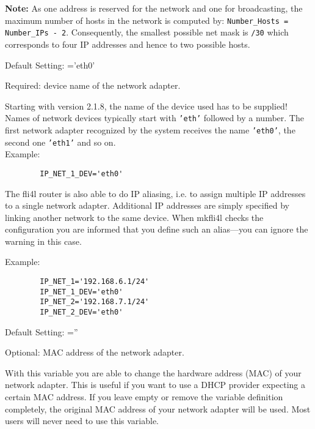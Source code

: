 \begin{description}
{   \textbf{Note: } As one address is reserved for the network and one for
   broadcasting, the maximum number of hosts in the network is computed by:
   \texttt{Number\_Hosts = Number\_IPs - 2}. Consequently, the smallest possible
   net mask is \texttt{/30} which corresponds to four IP addresses and hence to
   two possible hosts.
   }


  Default Setting: ='eth0'
  
  {Required: device name of the network adapter.

    Starting with version 2.1.8, the name of the device used has to be
    supplied! Names of network devices typically start with \texttt{'eth'} 
    followed by a number. The first network adapter recognized by the
    system receives the name \texttt{'eth0'}, the second one \texttt{'eth1'} and so on.\\

    Example:

  \begin{example}
  \begin{verbatim}
        IP_NET_1_DEV='eth0'
  \end{verbatim}
  \end{example}

    The fli4l router is also able to do IP aliasing, i.e. to assign multiple
    IP addresses to a single network adapter. Additional IP addresses are
    simply specified by linking another network to the same device. When
    mkfli4l checks the configuration you are informed that you define such an
    alias---you can ignore the warning in this case.

    Example:

  \begin{example}
  \begin{verbatim}
        IP_NET_1='192.168.6.1/24'
        IP_NET_1_DEV='eth0'
        IP_NET_2='192.168.7.1/24'
        IP_NET_2_DEV='eth0'
  \end{verbatim}
  \end{example}
  }

  
  Default Setting: =''

  {Optional: MAC address of the network adapter.

    With this variable you are able to change the hardware address (MAC) of
    your network adapter. This is useful if you want to use a DHCP provider
    expecting a certain MAC address.
    If you leave  empty or remove the variable definition
    completely, the original MAC address of your network adapter will be used.
    Most users will never need to use this variable.

}
\end{description}
